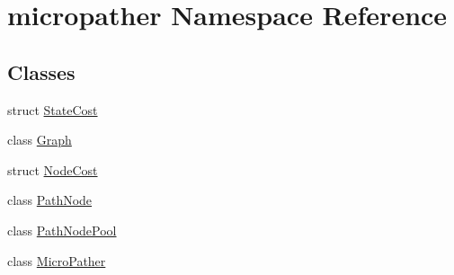 \hypertarget{namespacemicropather}{\section{micropather Namespace Reference}
\label{namespacemicropather}
}
\subsection*{Classes}
\begin{DoxyCompactItemize}
\item 
struct \hyperlink{structmicropather_1_1_state_cost}{State\-Cost}
\item 
class \hyperlink{classmicropather_1_1_graph}{Graph}
\item 
struct \hyperlink{structmicropather_1_1_node_cost}{Node\-Cost}
\item 
class \hyperlink{classmicropather_1_1_path_node}{Path\-Node}
\item 
class \hyperlink{classmicropather_1_1_path_node_pool}{Path\-Node\-Pool}
\item 
class \hyperlink{classmicropather_1_1_micro_pather}{Micro\-Pather}
\end{DoxyCompactItemize}
